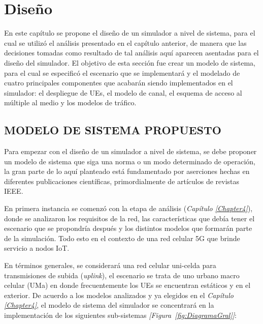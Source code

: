 
\chapter{Diseño} %

\label{Chapter5} %

En este capítulo se propone el diseño de un simulador a nivel de sistema, para el cual se utilizó el análisis presentado en el capítulo anterior, de manera que las decisiones tomadas como resultado de tal análisis aquí aparecen asentadas para el diseño del simulador. El objetivo  de esta sección fue crear un modelo de sistema, para el cual se especificó el escenario que se implementará y el modelado de cuatro principales componentes que acabarán siendo implementados en el simulador: el despliegue de UEs, el modelo de canal, el esquema de acceso al múltiple al medio y los modelos de tráfico.\newline



\section{MODELO DE SISTEMA PROPUESTO}

Para empezar con el diseño de un simulador a nivel de sistema, se debe proponer un modelo de sistema que siga una norma o un modo determinado de operación, la gran parte de lo aquí planteado está fundamentado por aserciones hechas en diferentes publicaciones científicas, primordialmente de artículos de revistas IEEE.

En primera instancia se comenzó con la etapa de análisis (\textit{Capítulo \ref{Chapter4}}), donde se analizaron los requisitos de la red, las características que debía tener el escenario que se propondría después y los distintos modelos que formarán parte de la simulación. Todo esto en el contexto de una red celular 5G que brinde servicio a nodos IoT.

En términos generales, se considerará una red celular uni-celda para transmisiones de subida (\textit{uplink}), el escenario se trata de uno urbano macro celular (UMa) en donde frecuentemente los UEs se encuentran estáticos y en el exterior. De acuerdo a los modelos analizados y ya elegidos en el \textit{Capítulo \ref{Chapter4}}, el modelo de sistema del simulador se concentrará en la implementación de los siguientes sub-sistemas \textit{[Figura~\ref{fig:DiagramaGral}]}:

